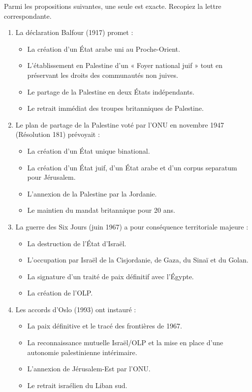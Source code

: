 \documentclass[11pt]{article}
\begin{document}
\begin{exercice}
Parmi les propositions suivantes, une seule est exacte. Recopiez la lettre correspondante.
\begin{enumerate}
    \item La déclaration Balfour (1917) promet :
    \begin{itemize}
        \item[A] La création d'un État arabe uni au Proche-Orient.
        \item[B] L'établissement en Palestine d'un « Foyer national juif » tout en préservant les droits des communautés non juives.
        \item[C] Le partage de la Palestine en deux États indépendants.
        \item[D] Le retrait immédiat des troupes britanniques de Palestine.
    \end{itemize}
    \item Le plan de partage de la Palestine voté par l'ONU en novembre 1947 (Résolution 181) prévoyait :
    \begin{itemize}
        \item[A] La création d'un État unique binational.
        \item[B] La création d'un État juif, d'un État arabe et d'un corpus separatum pour Jérusalem.
        \item[C] L'annexion de la Palestine par la Jordanie.
        \item[D] Le maintien du mandat britannique pour 20 ans.
    \end{itemize}
    \item La guerre des Six Jours (juin 1967) a pour conséquence territoriale majeure :
    \begin{itemize}
        \item[A] La destruction de l'État d'Israël.
        \item[B] L'occupation par Israël de la Cisjordanie, de Gaza, du Sinaï et du Golan.
        \item[C] La signature d'un traité de paix définitif avec l'Égypte.
        \item[D] La création de l'OLP.
    \end{itemize}
    \item Les accords d'Oslo (1993) ont instauré :
    \begin{itemize}
        \item[A] La paix définitive et le tracé des frontières de 1967.
        \item[B] La reconnaissance mutuelle Israël/OLP et la mise en place d'une autonomie palestinienne intérimaire.
        \item[C] L'annexion de Jérusalem-Est par l'ONU.
        \item[D] Le retrait israélien du Liban sud.
    \end{itemize}
\end{enumerate}
\end{exercice}
\end{document}
